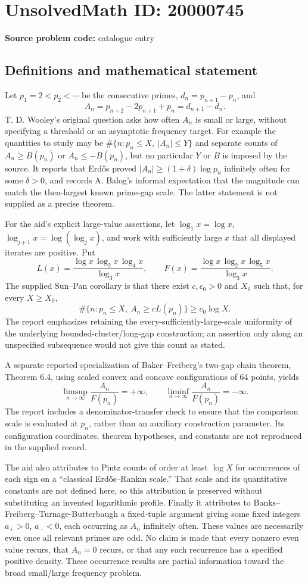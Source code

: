 \documentclass[11pt]{article}
\begin{document}
\section*{UnsolvedMath ID: 20000745}
\textbf{Source problem code:} catalogue entry
\subsection{Definitions and mathematical statement}
Let \(p_1=2<p_2<\cdots\) be the consecutive primes, \(d_n=p_{n+1}-p_n\), and
\[
 A_n=p_{n+2}-2p_{n+1}+p_n=d_{n+1}-d_n.
\]
T. D. Wooley's original question asks how often \(A_n\) is small or large, without specifying a threshold or an asymptotic frequency target. For example the quantities to study may be \(\#\{n:p_n\leq X,\ |A_n|\leq Y\}\) and separate counts of \(A_n\geq B(p_n)\) or \(A_n\leq-B(p_n)\), but no particular \(Y\) or \(B\) is imposed by the source. It reports that Erd\H{o}s proved \(|A_n|\geq(1+\delta)\log p_n\) infinitely often for some \(\delta>0\), and records A. Balog's informal expectation that the magnitude can match the then-largest known prime-gap scale. The latter statement is not supplied as a precise theorem.

For the aid's explicit large-value assertions, let \(\log_1x=\log x\), \(\log_{j+1}x=\log(\log_jx)\), and work with sufficiently large \(x\) that all displayed iterates are positive. Put
\[
 L(x)=\frac{\log x\,\log_2x\,\log_4x}{\log_3x},\qquad
 F(x)=\frac{\log x\,\log_2x\,\log_5x}{\log_3x}.
\]
The supplied Sun--Pan corollary is that there exist \(c,c_0>0\) and \(X_0\) such that, for every \(X\geq X_0\),
\[
 \#\{n:p_n\leq X,\ A_n\geq cL(p_n)\}\geq c_0\log X.
\]
The report emphasizes retaining the every-sufficiently-large-scale uniformity of the underlying bounded-cluster/long-gap construction; an assertion only along an unspecified subsequence would not give this count as stated.

A separate reported specialization of Baker--Freiberg's two-gap chain theorem, Theorem 6.4, using scaled convex and concave configurations of 64 points, yields
\[
 \limsup_{n\to\infty}\frac{A_n}{F(p_n)}=+\infty,
 \qquad
 \liminf_{n\to\infty}\frac{A_n}{F(p_n)}=-\infty.
\]
The report includes a denominator-transfer check to ensure that the comparison scale is evaluated at \(p_n\), rather than an auxiliary construction parameter. Its configuration coordinates, theorem hypotheses, and constants are not reproduced in the supplied record.

The aid also attributes to Pintz counts of order at least \(\log X\) for occurrences of each sign on a ``classical Erd\H{o}s--Rankin scale.'' That scale and its quantitative constants are not defined here, so this attribution is preserved without substituting an invented logarithmic profile. Finally it attributes to Banks--Freiberg--Turnage-Butterbaugh a fixed-tuple argument giving some fixed integers \(a_+>0\), \(a_-<0\), each occurring as \(A_n\) infinitely often. These values are necessarily even once all relevant primes are odd. No claim is made that every nonzero even value recurs, that \(A_n=0\) recurs, or that any such recurrence has a specified positive density. These occurrence results are partial information toward the broad small/large frequency problem.
\end{document}
